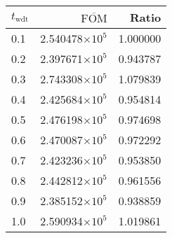 \begin{tabular}{lrr}
\toprule
$t_{\mathrm{wdt}}$ & $\overline{\mathrm{FOM}}$ &    Ratio \\
\midrule
               0.1 &   2.540478$\times 10^{5}$ & 1.000000 \\
               0.2 &   2.397671$\times 10^{5}$ & 0.943787 \\
               0.3 &   2.743308$\times 10^{5}$ & 1.079839 \\
               0.4 &   2.425684$\times 10^{5}$ & 0.954814 \\
               0.5 &   2.476198$\times 10^{5}$ & 0.974698 \\
               0.6 &   2.470087$\times 10^{5}$ & 0.972292 \\
               0.7 &   2.423236$\times 10^{5}$ & 0.953850 \\
               0.8 &   2.442812$\times 10^{5}$ & 0.961556 \\
               0.9 &   2.385152$\times 10^{5}$ & 0.938859 \\
               1.0 &   2.590934$\times 10^{5}$ & 1.019861 \\
\bottomrule
\end{tabular}
